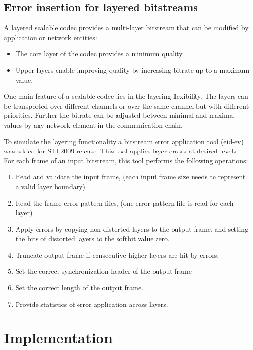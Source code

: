 \subsection{Error insertion for layered bitstreams}

A layered scalable codec provides a multi-layer bitstream that can be 
modified by application or network entities:
\begin{itemize}
\item The core layer of the codec provides a minimum quality. 
\item Upper layers enable improving quality by increasing bitrate up
  to a maximum value.
\end{itemize}
One main feature of a scalable codec lies in the layering flexibility. 
The layers can be transported over different channels or over the same 
channel but with different priorities. Further the bitrate can be adjusted 
between minimal and maximal values by any network element in the 
communication chain. 

To simulate the layering functionality a bitstream error application
tool (eid-ev) was added for STL2009 release. This tool applies layer
errors at desired levels. For each frame of an input bitstream, this
tool performs the following operations:
\begin{enumerate}
\item Read and validate the input frame, (each input frame size needs
  to represent a valid layer boundary) 
\item	Read the frame error pattern files, (one error pattern file is
  read for each layer)
\item Apply errors by copying non-distorted layers to the output
  frame, and setting the bits of distorted layers to the softbit value
  zero. 
\item Truncate output frame if consecutive higher layers are hit by errors.
\item Set the correct synchronization header of the output frame
\item Set the correct length of the output frame.
\item Provide statistics of error application across layers.
\end{enumerate}

\section{Implementation}

